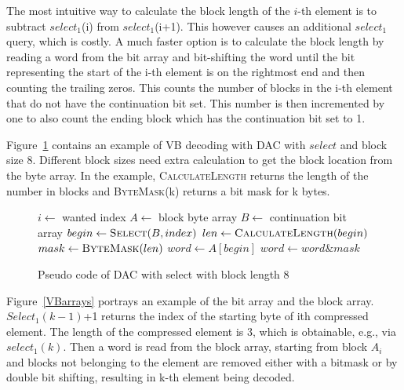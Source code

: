 The most intuitive way to calculate the block length of the $i$-th element is to subtract $select_1$(i) from $select_1$(i+1). This however causes an additional 
$select_1$ query, which is costly. A much faster option is to calculate the block length by reading a word from the bit array and bit-shifting the word until the bit representing the start of the i-th
element is on the rightmost end and then counting the trailing zeros. This counts the number of blocks in the i-th element that do not have the continuation bit set. This number is then incremented by one to 
also count the ending block which has the continuation bit set to 1.
 
Figure~\ref{select_pseudo} contains an example of VB decoding with DAC with $select$ and block size 8. 
Different block sizes need extra calculation to get the block location from the byte array. In the example, \textsc{CalculateLength} returns the length of the number in blocks and \textsc{ByteMask}(k) returns 
a bit mask for k bytes. 

\begin{figure}[ht]
\centering
\begin{algorithmic}
\State $i \gets $ wanted index
\State $A \gets $ block byte array
\State $B \gets $ continuation bit array
\State $begin \gets \Call{Select}{B, index}$
\State $len \gets \Call{CalculateLength}{begin}$
\State $mask \gets \Call{ByteMask}{len}$
\State $word \gets A[begin]$ 
\State $word \gets word \mathbin{\&} mask$ 


\end{algorithmic}
\caption{Pseudo code of DAC with select with block length 8} \label{select_pseudo}
\end{figure}

Figure~\ref{VBarrays} portrays an example of the bit array and the block array. $Select_1(k-1)$+1 returns the index of the starting byte of ith compressed element. The length of the compressed 
element is 3, which is obtainable, e.g., via $select_1(k)$. Then a word is read from the block array, starting from block $A_i$ and blocks not belonging to the element
are removed either with a bitmask or by double bit shifting, resulting in k-th element being decoded.

